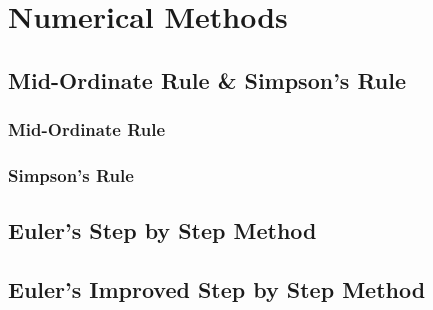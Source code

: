 \documentclass[../maths.tex]{subfiles}
\begin{document}
\chapter{Numerical Methods}
\section{Mid-Ordinate Rule \& Simpson's Rule}
\subsection*{Mid-Ordinate Rule}
\subsection*{Simpson's Rule}
\section{Euler's Step by Step Method}
\section{Euler's Improved Step by Step Method}
\end{document}
